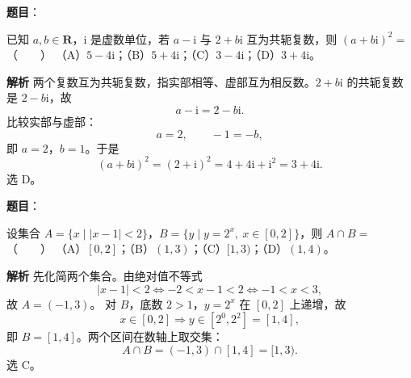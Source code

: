 
\begin{answer}

\textbf{题目}：

已知 $a,b\in\mathbf R$，$\mathrm i$ 是虚数单位，若 $a-\mathrm i$ 与 $2+b\mathrm i$ 互为共轭复数，则 $(a+b\mathrm i)^2=$\mbox{（　　）}
（A）$5-4\mathrm i$；（B）$5+4\mathrm i$；（C）$3-4\mathrm i$；（D）$3+4\mathrm i$。

\textbf{解析}
两个复数互为共轭复数，指实部相等、虚部互为相反数。$2+b\mathrm i$ 的共轭复数是 $2-b\mathrm i$，故
\nopagebreak[4]
\[a-\mathrm i=2-b\mathrm i .\]
比较实部与虚部：
\nopagebreak[4]
\[a=2,\qquad -1=-b,\]
即 $a=2$，$b=1$。于是
\nopagebreak[4]
\[(a+b\mathrm i)^2=(2+\mathrm i)^2=4+4\mathrm i+\mathrm i^2=3+4\mathrm i .\]
选 D。


\end{answer}
\begin{answer}

\textbf{题目}：

设集合 $A=\{x\mid |x-1|<2\}$，$B=\{y\mid y=2^x,\ x\in[0,2]\}$，则 $A\cap B=$\mbox{（　　）}
（A）$[0,2]$；（B）$(1,3)$；（C）$[1,3)$；（D）$(1,4)$。

\textbf{解析}
先化简两个集合。由绝对值不等式
\nopagebreak[4]
\[|x-1|<2\iff-2<x-1<2\iff-1<x<3,\]
故 $A=(-1,3)$。
对 $B$，底数 $2>1$，$y=2^x$ 在 $[0,2]$ 上递增，故
\nopagebreak[4]
\[x\in[0,2]\Longrightarrow y\in[2^0,2^2]=[1,4],\]
即 $B=[1,4]$。两个区间在数轴上取交集：
\nopagebreak[4]
\[A\cap B=(-1,3)\cap[1,4]=[1,3).\]
选 C。

\gkanswer{答案：C。$|x-1|<2\iff-1<x<3$，又 $B=[1,4]$，取交得 $[1,3)$。}

\end{answer}
